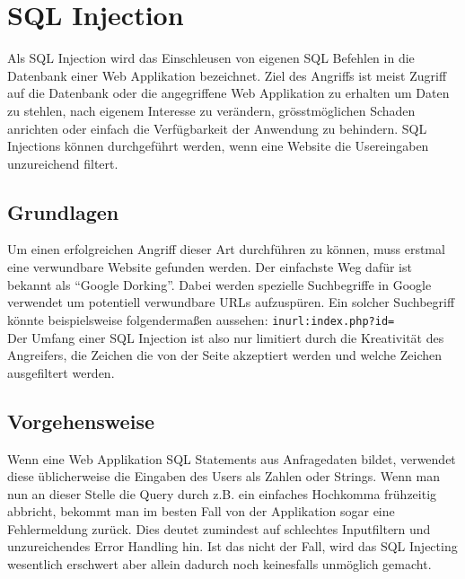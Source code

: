 \section{SQL Injection}
Als SQL Injection wird das Einschleusen von eigenen SQL Befehlen in die Datenbank einer Web Applikation bezeichnet. Ziel des Angriffs ist meist Zugriff auf die Datenbank oder die angegriffene Web Applikation zu erhalten um Daten zu stehlen, nach eigenem Interesse zu ver\"andern, gr\"o{ss}tm\"oglichen Schaden anrichten oder einfach die Verf\"ugbarkeit der Anwendung zu behindern. SQL Injections k\"onnen durchgef\"uhrt werden, wenn eine Website die Usereingaben unzureichend filtert.\cite{hackingWebAppsBuch}

\subsection{Grundlagen}
Um einen erfolgreichen Angriff dieser Art durchf\"uhren zu k\"onnen, muss erstmal eine verwundbare Website gefunden werden. Der einfachste Weg daf\"ur ist bekannt als ``Google Dorking''. Dabei werden spezielle Suchbegriffe in Google verwendet um potentiell verwundbare URLs aufzusp\"uren. Ein solcher Suchbegriff k\"onnte beispielsweise folgenderma{\ss}en aussehen: \texttt{inurl:index.php?id=} \cite{sqlinjectionTutorial}\\
Der Umfang einer SQL Injection ist also nur limitiert durch die Kreativit\"at des Angreifers, die Zeichen die von der Seite akzeptiert werden und welche Zeichen ausgefiltert werden.
\cite{sqlinjectionTutorial}

\subsection{Vorgehensweise}
Wenn eine Web Applikation SQL Statements aus Anfragedaten bildet, verwendet diese \"ublicherweise die Eingaben des Users als Zahlen oder Strings. Wenn man nun an dieser Stelle die Query durch z.B. ein einfaches Hochkomma fr\"uhzeitig abbricht, bekommt man im besten Fall von der Applikation sogar eine Fehlermeldung zur\"uck. Dies deutet zumindest auf schlechtes Inputfiltern und unzureichendes Error Handling hin. Ist das nicht der Fall, wird das SQL Injecting wesentlich erschwert aber allein dadurch noch keinesfalls unm\"oglich gemacht.

\clearpage
